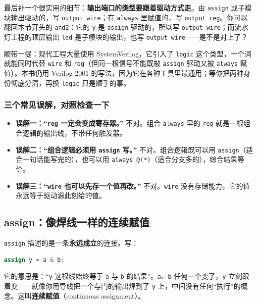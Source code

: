 最后补一个很实用的细节：\textbf{输出端口的类型要跟着驱动方式走}。由 \texttt{assign} 或子模块输出驱动的，写 \texttt{output wire}；在 \texttt{always} 里赋值的，写 \texttt{output reg}。你可以翻回本节开头的 \texttt{and2}：它的 \texttt{y} 是 \texttt{assign} 驱动的，所以写 \texttt{output wire}；而流水灯工程的顶层输出 \texttt{led} 是子模块的输出，也写 \texttt{output wire}——是不是对上了？

顺带一提：现代工程大量使用 SystemVerilog，它引入了 \texttt{logic} 这个类型，一个词就能同时代替 \texttt{wire} 和 \texttt{reg}（但同一根信号不能既被 \texttt{assign} 驱动又被 \texttt{always} 赋值）。本书仍用 Verilog-2001 的写法，因为它在各种工具里最通用；等你把两种身份彻底分清，再换 \texttt{logic} 只是顺手的事。

\subsubsection*{三个常见误解，对照检查一下}

\begin{itemize}
  \item \textbf{误解一：“\texttt{reg} 一定会变成寄存器。”} 不对。组合 \texttt{always} 里的 \texttt{reg} 就是一根组合逻辑的输出线，不带任何触发器。
  \item \textbf{误解二：“组合逻辑必须用 \texttt{assign} 写。”} 不对。组合逻辑既可以用 \texttt{assign}（适合一句话能写完的），也可以用 \texttt{always @(*)}（适合分支多的），综合结果等价。
  \item \textbf{误解三：“\texttt{wire} 也可以先存一个值再改。”} 不对。\texttt{wire} 没有存储能力，它的值永远等于驱动源此刻给的值。
\end{itemize}

\subsection{assign：像焊线一样的连续赋值}

\texttt{assign} 描述的是一条\textbf{永远成立}的连接。写：

\begin{lstlisting}[language=Verilog,numbers=none]
assign y = a & b;
\end{lstlisting}

它的意思是：“\texttt{y} 这根线始终等于 \texttt{a} 与 \texttt{b} 的结果”。\texttt{a}、\texttt{b} 任何一个变了，\texttt{y} 立刻跟着变——就像你用导线把一个与门的输出焊到了 \texttt{y} 上，中间没有任何“执行”的概念。这叫\textbf{连续赋值}（continuous assignment）。

